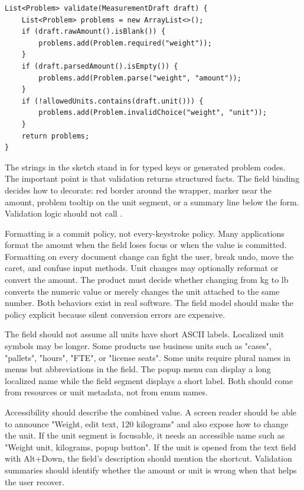 \begin{lstlisting}[caption={Unit-aware validation returns field problems, not border choices.}]
List<Problem> validate(MeasurementDraft draft) {
    List<Problem> problems = new ArrayList<>();
    if (draft.rawAmount().isBlank()) {
        problems.add(Problem.required("weight"));
    }
    if (draft.parsedAmount().isEmpty()) {
        problems.add(Problem.parse("weight", "amount"));
    }
    if (!allowedUnits.contains(draft.unit())) {
        problems.add(Problem.invalidChoice("weight", "unit"));
    }
    return problems;
}
\end{lstlisting}

The strings in the sketch stand in for typed keys or generated problem codes. The
important point is that validation returns structured facts. The field binding decides
how to decorate: red border around the wrapper, marker near the amount, problem tooltip
on the unit segment, or a summary line below the form. Validation logic should not call
.

Formatting is a commit policy, not every-keystroke policy. Many applications format the
amount when the field loses focus or when the value is committed. Formatting on every
document change can fight the user, break undo, move the caret, and confuse input
methods. Unit changes may optionally reformat or convert the amount. The product must
decide whether changing from kg to lb converts the numeric value or merely changes the
unit attached to the same number. Both behaviors exist in real software. The field model
should make the policy explicit because silent conversion errors are expensive.

The field should not assume all units have short ASCII labels. Localized unit symbols
may be longer. Some products use business units such as "cases", "pallets", "hours",
"FTE", or "license seats". Some units require plural names in menus but abbreviations in
the field. The popup menu can display a long localized name while the field segment
displays a short label. Both should come from resources or unit metadata, not from enum
names.

Accessibility should describe the combined value. A screen reader should be able to
announce "Weight, edit text, 120 kilograms" and also expose how to change the unit. If
the unit segment is focusable, it needs an accessible name such as "Weight unit,
kilograms, popup button". If the unit is opened from the text field with Alt+Down, the
field's description should mention the shortcut. Validation summaries should identify
whether the amount or unit is wrong when that helps the user recover.

